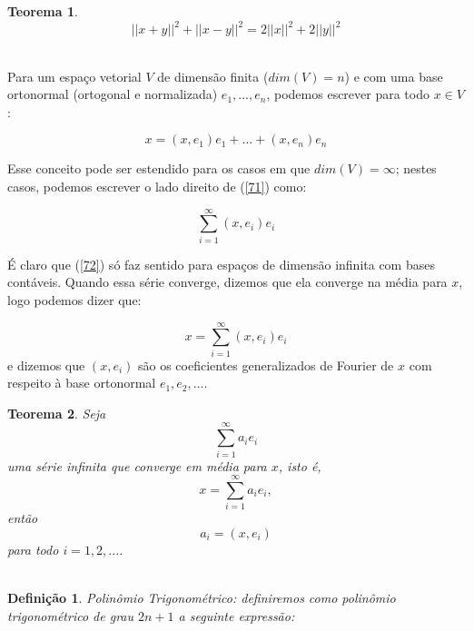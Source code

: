 \documentclass[a4paper,portuguese,9pt,final]{extarticle}
\newtheorem{theorem}{Teorema}[section]
\newtheorem*{definition}{Definição}
\begin{document}
\begin{multicols*}{2}
\begin{theorem}
                $$ ||x+y||^{2} + ||x-y||^{2} =  2 ||x||^{2} + 2 ||y||^{2} $$ \\
            \end{theorem}

            Para um espaço vetorial $ V $ de dimensão finita ($ dim(V)=n $) e com uma base ortonormal (ortogonal e normalizada) $ e_{1},...,e_{n} $, podemos escrever para todo $ x \in V $:

            \begin{equation}
            x=(x,e_{1})e_{1}+...+(x,e_{n})e_{n}
            \label{71}
            \end{equation}

            Esse conceito pode ser estendido para os casos em que $ dim(V)=\infty $; nestes casos, podemos escrever o lado direito de (\ref{71}) como:

            \begin{equation}
            \sum_{i=1}^{\infty} (x,e_{i})e_{i}
            \label{72}
            \end{equation}


            É claro que (\ref{72}) só faz sentido para espaços de dimensão infinita com bases contáveis. Quando essa série converge, dizemos que ela converge na média para $ x $, logo podemos dizer que:

            $$\displaystyle  x = \sum_{i=1}^{\infty} (x,e_{i})e_{i}  $$
            e dizemos que $ (x,e_{i}) $ são os coeficientes generalizados de Fourier de $ x $ com respeito à base ortonormal $ e_{1}, e_{2},... $. 
            \

            \begin{theorem}

                Seja $$\displaystyle \sum_{i=1}^{\infty}a_{i}e_{i} $$ uma série infinita que converge em média para $ x $, isto é, $$\displaystyle x=\sum_{i=1}^{\infty}a_{i}e_{i},$$ então $$ a_{i}=(x,e_{i}) $$ para todo $ i=1,2,... $. \\ \\ 

            \end{theorem}

            \begin{definition}
                Polinômio Trigonométrico: definiremos como polinômio trigonométrico de grau $ 2n+1 $ a seguinte expressão:


\end{definition}
\end{multicols*}
\end{document}
